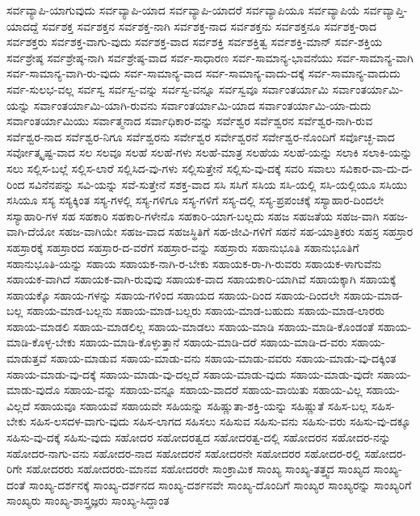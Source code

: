 {ಸರ್ವವ್ಯಾಪಿ-ಯಾಗುವುದು
ಸರ್ವವ್ಯಾಪಿ-ಯಾದ
ಸರ್ವವ್ಯಾಪಿ-ಯಾದರೆ
ಸರ್ವವ್ಯಾಪಿಯೂ
ಸರ್ವವ್ಯಾಪಿಯೆ
ಸರ್ವವ್ಯಾಪ್ತಿ-ಯಾದದ್ದೆ
ಸರ್ವಶಕ್ತ
ಸರ್ವಶಕ್ತನ
ಸರ್ವಶಕ್ತ-ನಾಗಿ
ಸರ್ವಶಕ್ತ-ನಾದ
ಸರ್ವಶಕ್ತನು
ಸರ್ವಶಕ್ತನೂ
ಸರ್ವಶಕ್ತ-ರಾದ
ಸರ್ವಶಕ್ತರು
ಸರ್ವಶಕ್ತ-ವಾಗು-ವುದು
ಸರ್ವಶಕ್ತ-ವಾದ
ಸರ್ವಶಕ್ತಿ
ಸರ್ವಶಕ್ತಿತ್ವ
ಸರ್ವಶಕ್ತಿ-ಮಾನ್
ಸರ್ವ-ಶಕ್ತಿಯ
ಸರ್ವಶ್ರೇಷ್ಠ
ಸರ್ವಶ್ರೇಷ್ಠ-ನಾಗಿ
ಸರ್ವಶ್ರೇಷ್ಠ-ವಾದ
ಸರ್ವ-ಸಾಧಾರಣ
ಸರ್ವ-ಸಾಮಾನ್ಯ-ಭಾವನೆಯು
ಸರ್ವ-ಸಾಮಾನ್ಯ-ವಾಗಿ
ಸರ್ವ-ಸಾಮಾನ್ಯ-ವಾಗಿ-ರು-ವುದು
ಸರ್ವ-ಸಾಮಾನ್ಯ-ವಾದ
ಸರ್ವ-ಸಾಮಾನ್ಯ-ವಾದು-ದಕ್ಕೆ
ಸರ್ವ-ಸಾಮಾನ್ಯ-ವಾದುದು
ಸರ್ವ-ಸುಲಭ-ವಲ್ಲ
ಸರ್ವಸ್ವ
ಸರ್ವಸ್ವ-ವನ್ನು
ಸರ್ವಸ್ವ-ವನ್ನೂ
ಸರ್ವಸ್ವವೂ
ಸರ್ವಾಂತರ್ಯಾಮಿ
ಸರ್ವಾಂತರ್ಯಾಮಿ-ಯನ್ನು
ಸರ್ವಾಂತರ್ಯಾಮಿ-ಯಾಗಿ-ರುವನು
ಸರ್ವಾಂತರ್ಯಾಮಿ-ಯಾದ
ಸರ್ವಾಂತರ್ಯಾಮಿ-ಯಾ-ದುದು
ಸರ್ವಾಂತರ್ಯಾಮಿಯು
ಸರ್ವಾತ್ಮನಾದ
ಸರ್ವಾಧಿಕಾರ-ವನ್ನು
ಸರ್ವೆಶ್ವರ
ಸರ್ವೆಶ್ವರನ
ಸರ್ವೆಶ್ವರ-ನಾಗಿ-ರುವ
ಸರ್ವೆಶ್ವರ-ನಾದ
ಸರ್ವೆಶ್ವರ-ನಿಗೂ
ಸರ್ವೆಶ್ವರನು
ಸರ್ವೇಶ್ವರ
ಸರ್ವೇಶ್ವರನೆ
ಸರ್ವೇಶ್ವರ-ನೊಂದಿಗೆ
ಸರ್ವೊಚ್ಛ-ವಾದ
ಸರ್ವೋತ್ಕೃಷ್ಟ-ವಾದ
ಸಲ
ಸಲವೂ
ಸಲಹೆ
ಸಲಹೆ-ಗಳು
ಸಲಹೆ-ಮಾತ್ರ
ಸಲಹೆಯ
ಸಲಹೆ-ಯನ್ನು
ಸಲಾಕಿ
ಸಲಾಕಿ-ಯನ್ನು
ಸಲು
ಸಲ್ಲಿಸ-ಬಲ್ಲೆ
ಸಲ್ಲಿಸ-ಲಾರೆ
ಸಲ್ಲಿಸಿದ-ವು-ಗಳು
ಸಲ್ಲಿಸುತ್ತೇನೆ
ಸಲ್ಲಿಸು-ವು-ದಕ್ಕೆ
ಸವರಿ
ಸವಾಲು
ಸವಿಕಾರ-ವಾ-ದು-ದ-ರಿಂದ
ಸವಿನೆನಪನ್ನು
ಸವಿ-ಯನ್ನು
ಸವೆ-ಸುತ್ತೇನೆ
ಸಶಕ್ತ-ವಾದ
ಸಸಿ
ಸಸಿಗೆ
ಸಸಿಯ
ಸಸಿ-ಯಲ್ಲಿ
ಸಸಿ-ಯಲ್ಲಿಯೂ
ಸಸಿಯು
ಸಸಿಯೂ
ಸಸ್ಯ
ಸಸ್ಯಕ್ಕಿಂತ
ಸಸ್ಯ-ಗಳಲ್ಲಿ
ಸಸ್ಯ-ಗಳಿಗೂ
ಸಸ್ಯ-ಗಳಿಗೆ
ಸಸ್ಯ-ದಲ್ಲಿ
ಸಸ್ಯ-ಪ್ರಪಂಚಕ್ಕೆ
ಸಸ್ಯಾಹಾರ-ದಿಂದಲೇ
ಸಸ್ಯಾಹಾರಿ-ಗಳ
ಸಹ
ಸಹಕಾರಿ
ಸಹಕಾರಿ-ಗಳೇನೊ
ಸಹಕಾರಿ-ಯಾಗ-ಬಲ್ಲದು
ಸಹಜ
ಸಹಜತೆಯ
ಸಹಜ-ವಾಗಿ
ಸಹಜ-ವಾಗಿ-ದೆಯೋ
ಸಹಜ-ವಾಗಿಯೇ
ಸಹಜ-ವಾದ
ಸಹಜಸ್ಥಿತಿಗೆ
ಸಹ-ಜೀವಿ-ಗಳಿಗೆ
ಸಹನೆ
ಸಹ-ಯಾತ್ರಿಕರು
ಸಹಸ್ರ
ಸಹಸ್ರಾರ
ಸಹಸ್ರಾರಕ್ಕೆ
ಸಹಸ್ರಾರದ
ಸಹಸ್ರಾರ-ದ-ವರೆಗೆ
ಸಹಸ್ರಾರ-ವನ್ನು
ಸಹಸ್ರಾರು
ಸಹಾನುಭೂತಿ
ಸಹಾನುಭೂತಿಗೆ
ಸಹಾನುಭೂತಿ-ಯನ್ನು
ಸಹಾಯ
ಸಹಾಯಕ-ನಾಗಿ-ರ-ಬೇಕು
ಸಹಾಯಕ-ರಾ-ಗಿ-ರುವರು
ಸಹಾಯಕ-ಳಾಗುವೆನು
ಸಹಾಯಕ-ವಾಗಿದೆ
ಸಹಾಯಕ-ವಾಗಿ-ರುವುವು
ಸಹಾಯಕ-ವಾದ
ಸಹಾಯಕಾರಿ-ಯಾಗಿವೆ
ಸಹಾಯಕ್ಕಾಗಿ
ಸಹಾಯಕ್ಕೆ
ಸಹಾಯಕ್ಕೊ
ಸಹಾಯ-ಗಳನ್ನು
ಸಹಾಯ-ಗಳಿಂದ
ಸಹಾಯದ
ಸಹಾಯ-ದಿಂದ
ಸಹಾಯ-ದಿಂದಲೇ
ಸಹಾಯ-ಮಾಡ-ಬಲ್ಲ
ಸಹಾಯ-ಮಾಡ-ಬಲ್ಲನು
ಸಹಾಯ-ಮಾಡ-ಬಲ್ಲರು
ಸಹಾಯ-ಮಾಡ-ಬಹುದು
ಸಹಾಯ-ಮಾಡ-ಲಾರರು
ಸಹಾಯ-ಮಾಡಲಿ
ಸಹಾಯ-ಮಾಡಲಿಲ್ಲ
ಸಹಾಯ-ಮಾಡಲು
ಸಹಾಯ-ಮಾಡಿ
ಸಹಾಯ-ಮಾಡಿ-ಕೊಂಡಂತೆ
ಸಹಾಯ-ಮಾಡಿ-ಕೊಳ್ಳ-ಬೇಕು
ಸಹಾಯ-ಮಾಡಿ-ಕೊಳ್ಳುತ್ತಾನೆ
ಸಹಾಯ-ಮಾಡಿ-ದರೆ
ಸಹಾಯ-ಮಾಡಿ-ದ-ವರು
ಸಹಾಯ-ಮಾಡುತ್ತವೆ
ಸಹಾಯ-ಮಾಡುವ
ಸಹಾಯ-ಮಾಡು-ವನು
ಸಹಾಯ-ಮಾಡು-ವವರು
ಸಹಾಯ-ಮಾಡು-ವು-ದಕ್ಕಿಂತ
ಸಹಾಯ-ಮಾಡು-ವು-ದಕ್ಕೆ
ಸಹಾಯ-ಮಾಡು-ವು-ದಲ್ಲದೆ
ಸಹಾಯ-ಮಾಡು-ವುದು
ಸಹಾಯ-ಮಾಡು-ವುದೇ
ಸಹಾಯ-ಮಾಡು-ವುದೊ
ಸಹಾಯ-ವನ್ನು
ಸಹಾಯ-ವನ್ನೂ
ಸಹಾಯ-ವಾದರೆ
ಸಹಾಯ-ವಾಯಿತು
ಸಹಾಯ-ವಿಲ್ಲ
ಸಹಾಯ-ವಿಲ್ಲದೆ
ಸಹಾಯವೂ
ಸಹಾಯವೆ
ಸಹಾಯವೇ
ಸಹಿಯನ್ನು
ಸಹಿಷ್ಣುತಾ-ಶಕ್ತಿ-ಯನ್ನು
ಸಹಿಷ್ಣುತೆ
ಸಹಿಸ-ಬಲ್ಲ
ಸಹಿಸ-ಬೇಕು
ಸಹಿಸ-ಲಸದಳ-ವಾಗು-ವುದು
ಸಹಿಸ-ಲಾಗದ
ಸಹಿಸಲು
ಸಹಿಸುವ
ಸಹಿಸು-ವನು
ಸಹಿಸು-ವರು
ಸಹಿಸು-ವು-ದಕ್ಕೂ
ಸಹಿಸು-ವು-ದಕ್ಕೆ
ಸಹಿಸು-ವುದು
ಸಹೋದರ
ಸಹೋದರತ್ವದ
ಸಹೋದರತ್ವ-ದಲ್ಲಿ
ಸಹೋದರನ
ಸಹೋದರ-ನನ್ನು
ಸಹೋದರ-ನಾಗು-ವನು
ಸಹೋದರ-ನಾದ
ಸಹೋದರನೆ
ಸಹೋದರನೇ
ಸಹೋದರರ
ಸಹೋದರ-ರಲ್ಲಿ
ಸಹೋದರ-ರಿಗೇ
ಸಹೋದರರು
ಸಹೋದರರು-ಮಾನವ
ಸಹೋದರರೇ
ಸಾಂಕ್ರಾಮಿಕ
ಸಾಂಖ್ಯ
ಸಾಂಖ್ಯ-ತತ್ತ್ವದ
ಸಾಂಖ್ಯದ
ಸಾಂಖ್ಯ-ದಂತೆ
ಸಾಂಖ್ಯ-ದರ್ಶನಕ್ಕೆ
ಸಾಂಖ್ಯ-ದರ್ಶನದ
ಸಾಂಖ್ಯ-ದರ್ಶನವೇ
ಸಾಂಖ್ಯ-ದೊಂದಿಗೆ
ಸಾಂಖ್ಯರ
ಸಾಂಖ್ಯರನ್ನು
ಸಾಂಖ್ಯರಿಗೆ
ಸಾಂಖ್ಯರು
ಸಾಂಖ್ಯ-ಶಾಸ್ತ್ರಜ್ಞರು
ಸಾಂಖ್ಯ-ಸಿದ್ದಾಂತ
}
